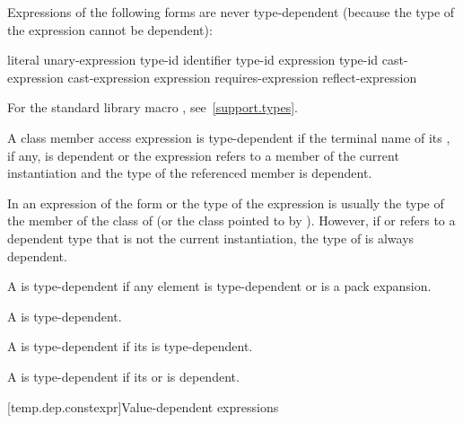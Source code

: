 \pnum
Expressions of the following forms are never type-dependent (because the type
of the expression cannot be dependent):

\begin{ncsimplebnf}
literal\br
{} unary-expression\br
{} \terminal{(} type-id \terminal{)}\br
{}  \terminal{(} identifier \terminal{)}\br
{} \terminal{(} type-id \terminal{)}\br
{} \terminal{(} expression \terminal{)}\br
{} \terminal{(} type-id \terminal{)}\br
\opt{\terminal{::}}  cast-expression\br
\opt{\terminal{::}}  \terminal{[} \terminal{]} cast-expression\br
{} \br
{} \terminal{(} expression \terminal{)}\br
requires-expression\br
reflect-expression
\end{ncsimplebnf}

\begin{note}
For the standard library macro ,
see~\ref{support.types}.
\end{note}

\pnum
A class member access expression is
type-dependent if
the terminal name of its , if any, is dependent or
the expression refers to a member of the current instantiation and
the type of the referenced member is dependent.
\begin{note}
In an expression of the form
or
the type of the expression is usually the type of the member
of the class of
(or the class pointed to by
).
However, if
or
refers to a dependent type that is not the current instantiation,
the type of
is always dependent.
\end{note}

\pnum
A  is type-dependent if any element is
type-dependent or is a pack expansion.

\pnum
A  is type-dependent.

\pnum
A  is type-dependent
if its  is type-dependent.

\pnum
A  is type-dependent
if its  or
is dependent.

[temp.dep.constexpr]{Value-dependent expressions}

